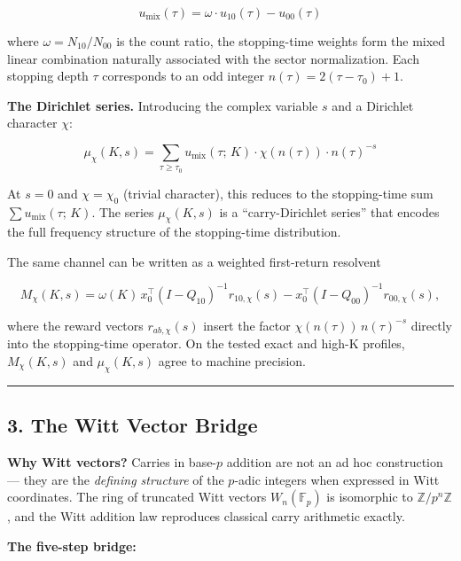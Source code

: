 \documentclass[
  11pt,
]{article}
\begin{document}
\[u_{\mathrm{mix}}(\tau) = \omega \cdot u_{10}(\tau) - u_{00}(\tau)\]

where \(\omega = N_{10}/N_{00}\) is the count ratio, the stopping-time weights
form the mixed linear combination naturally associated with the sector
normalization. Each stopping depth \(\tau\) corresponds to an odd integer
\(n(\tau) = 2(\tau - \tau_0) + 1\).

\textbf{The Dirichlet series.} Introducing the complex variable \(s\) and a
Dirichlet character \(\chi\):

\[\mu_\chi(K, s) = \sum_{\tau \geq \tau_0} u_{\mathrm{mix}}(\tau;\, K) \cdot \chi(n(\tau)) \cdot n(\tau)^{-s}\]

At \(s = 0\) and \(\chi = \chi_0\) (trivial character), this reduces to the
stopping-time sum \(\sum u_{\mathrm{mix}}(\tau;\, K)\). The series
\(\mu_\chi(K, s)\) is a ``carry-Dirichlet series'' that encodes the full
frequency structure of the stopping-time distribution.

The same channel can be written as a weighted first-return resolvent

\[M_\chi(K,s)=\omega(K)\,x_0^\top(I-Q_{10})^{-1}r_{10,\chi}(s)-x_0^\top(I-Q_{00})^{-1}r_{00,\chi}(s),\]

where the reward vectors \(r_{ab,\chi}(s)\) insert the factor
\(\chi(n(\tau))\,n(\tau)^{-s}\) directly into the stopping-time operator. On the
tested exact and high-K profiles, \(M_\chi(K,s)\) and \(\mu_\chi(K,s)\) agree to
machine precision.

\begin{center}\rule{0.5\linewidth}{0.5pt}\end{center}

\newpage

\subsection{3. The Witt Vector Bridge}\label{the-witt-vector-bridge}

\textbf{Why Witt vectors?} Carries in base-\(p\) addition are not an ad hoc
construction --- they are the \emph{defining structure} of the \(p\)-adic
integers when expressed in Witt coordinates. The ring of truncated Witt vectors
\(W_n(\mathbb{F}_p)\) is isomorphic to \(\mathbb{Z}/p^n\mathbb{Z}\), and the
Witt addition law reproduces classical carry arithmetic exactly.

\textbf{The five-step bridge:}
\end{document}
